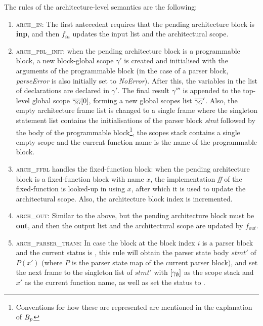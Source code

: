 \documentclass[UTF8]{article}
\begin{document}
The rules of the architecture-level semantics are the following:
\begin{enumerate}
\item \textsc{arch\_in}: The first antecedent requires that the pending architecture block is \textbf{inp}, and then $f_{ \mathit{in} }$ updates the input list and the architectural scope.

\item \textsc{arch\_pbl\_init}: when the pending architecture block is a programmable block, a new block-global scope $\gamma'$ is created and initialised with the arguments of the programmable block (in the case of a parser block, \textit{parseError} is also initially set to \textit{NoError}). After this, the variables in the list of declarations are declared in $\gamma'$. The final result $\gamma'''$ is appended to the top-level global scope $\overline{\gamma_G} [0]$, forming a new global scopes list $\overline{\gamma_G}'$. Also, the empty architecture frame list is changed to a single frame where the singleton statement list contains the initialisations of the parser block \textit{stmt} followed by the body of the programmable block\footnote{Conventions for how these are represented are mentioned in the explanation of $B_p$}, the scopes stack contains a single empty scope and the current function name is the name of the programmable block.

\item \textsc{arch\_ffbl} handles the fixed-function block: when the pending architecture block is a fixed-function block with name $x$, the implementation \textit{ff} of the fixed-function is looked-up in \ffbm{} using $x$, after which it is used to update the architectural scope. Also, the architecture block index is incremented.

\item \textsc{arch\_out}: Similar to the above, but the pending architecture block must be \textbf{out}, and then the output list and the architectural scope are updated by $f_{ \mathit{out} }$.

\item \textsc{arch\_parser\_trans}: In case the block at the block index $i$ is a parser block and the current status is , this rule will obtain the parser state body $\mathit{stmt}'$ of $P(x')$ (where $P$ is the parser state map of the current parser block), and set the next frame to the singleton list of $\mathit{stmt}'$ with $[{\gamma}_{\emptyset}{}]$ as the scope stack and $x'$ as the current function name, as well as set the status to \running{}.


\end{enumerate}
\end{document}
